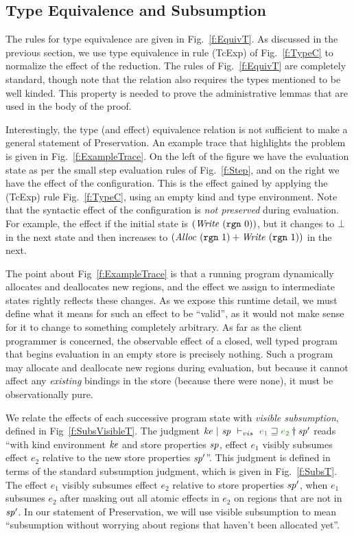 



\subsection{Type Equivalence and Subsumption}
\label{s:Subsumption}

The rules for type equivalence are given in Fig.~\ref{f:EquivT}. As discussed in the previous section, we use type equivalence in rule (TcExp) of Fig.~\ref{f:TypeC} to normalize the effect of the reduction. The rules of Fig.~\ref{f:EquivT} are completely standard, though note that the relation also requires the types mentioned to be well kinded. This property is needed to prove the administrative lemmas that are used in the body of the proof. 

Interestingly, the type (and effect) equivalence relation is not sufficient to make a general statement of Preservation. An example trace that highlights the problem is given in Fig.~\ref{f:ExampleTrace}. On the left of the figure we have the evaluation state as per the small step evaluation rules of Fig.~\ref{f:Step}, and on the right we have the effect of the configuration. This is the effect gained by applying the (TcExp) rule Fig.~\ref{f:TypeC}, using an empty kind and type environment. Note that the syntactic effect of the configuration is \emph{not preserved} during evaluation. For example, the effect if the initial state is $(\mathit{Write}~ (\texttt{rgn}~ 0))$, but it changes to $\bot$ in the next state and then increases to $(\mathit{Alloc}~ (\texttt{rgn}~ 1) + \mathit{Write}~ (\texttt{rgn}~ 1))$ in the next. 

The point about Fig~\ref{f:ExampleTrace} is that a running program dynamically allocates and deallocates new regions, and the effect we assign to intermediate states rightly reflects these changes. As we expose this runtime detail, we must define what it means for such an effect to be ``valid'', as it would not make sense for it to change to something completely arbitrary. As far as the client programmer is concerned, the observable effect of a closed, well typed program that begins evaluation in an empty store is precisely nothing. Such a program may allocate and deallocate new regions during evaluation, but because it cannot affect any \emph{existing} bindings in the store (because there were none), it must be observationally pure.

We relate the effects of each successive program state with \emph{visible subsumption}, defined in Fig~\ref{f:SubsVisibleT}. The judgment $\SubsVisibleT{\mke}{\msp}{\msp'}{e_1}{e_2}$ reads ``with kind environment $\mathit{ke}$ and store properties $\mathit{sp}$, effect $e_1$ visibly subsumes effect $e_2$ relative to the new store properties $\mathit{sp}'$''. This judgment is defined in terms of the standard subsumption judgment, which is given in Fig.~\ref{f:SubsT}. The effect $e_1$ visibly subsumes effect $e_2$ relative to store properties $\mathit{sp}'$, when $e_1$ subsumes $e_2$ after masking out all atomic effects in $e_2$ on regions that are not in $\mathit{sp}'$. In our statement of Preservation, we will use visible subsumption to mean ``subsumption without worrying about regions that haven't been allocated yet''. 

